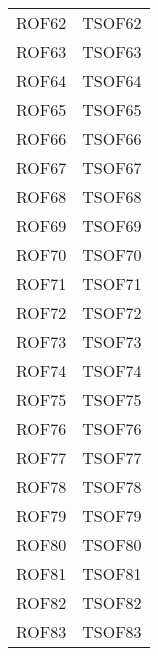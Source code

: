 \documentclass[../PianoDiQualifica_v3.0.0.tex]{subfiles}
\begin{document}
\begin{longtable}[c] { >{\centering\arraybackslash}p{3cm} >{\centering\arraybackslash}p{3cm}}
			ROF62 & TSOF62 \\
			\addlinespace[0.3em]
			\midrule
			\addlinespace[0.3em]
			ROF63 & TSOF63 \\
			\addlinespace[0.3em]
			\midrule
			\addlinespace[0.3em]
			ROF64 & TSOF64 \\
			\addlinespace[0.3em]
			\midrule
			\addlinespace[0.3em]
			ROF65 & TSOF65 \\
			\addlinespace[0.3em]
			\midrule
			\addlinespace[0.3em]
			ROF66 & TSOF66 \\
			\addlinespace[0.3em]
			\midrule
			\addlinespace[0.3em]
			ROF67 & TSOF67 \\
			\addlinespace[0.3em]
			\midrule
			\addlinespace[0.3em]
			ROF68 & TSOF68 \\
			\addlinespace[0.3em]
			\midrule
			\addlinespace[0.3em]
			ROF69 & TSOF69 \\
			\addlinespace[0.3em]
			\midrule
			\addlinespace[0.3em]
			ROF70 & TSOF70 \\
			\addlinespace[0.3em]
			\midrule
			\addlinespace[0.3em]
			ROF71 & TSOF71 \\
			\addlinespace[0.3em]
			\midrule
			\addlinespace[0.3em]
			ROF72 & TSOF72 \\
			\addlinespace[0.3em]
			\midrule
			\addlinespace[0.3em]
			ROF73 & TSOF73 \\
			\addlinespace[0.3em]
			\midrule
			\addlinespace[0.3em]
			ROF74 & TSOF74 \\
			\addlinespace[0.3em]
			\midrule
			\addlinespace[0.3em]
			ROF75 & TSOF75 \\
			\addlinespace[0.3em]
			\midrule
			\addlinespace[0.3em]
			ROF76 & TSOF76 \\
			\addlinespace[0.3em]
			\midrule
			\addlinespace[0.3em]
			ROF77 & TSOF77 \\
			\addlinespace[0.3em]
			\midrule
			\addlinespace[0.3em]
			ROF78 & TSOF78 \\
			\addlinespace[0.3em]
			\midrule
			\addlinespace[0.3em]
			ROF79 & TSOF79 \\
			\addlinespace[0.3em]
			\midrule
			\addlinespace[0.3em]
			ROF80 & TSOF80 \\
			\addlinespace[0.3em]
			\midrule
			\addlinespace[0.3em]
			ROF81 & TSOF81 \\
			\addlinespace[0.3em]
			\midrule
			\addlinespace[0.3em]
			ROF82 & TSOF82 \\
			\addlinespace[0.3em]
			\midrule
			\addlinespace[0.3em]
			ROF83 & TSOF83 \\

\end{longtable}
\end{document}
